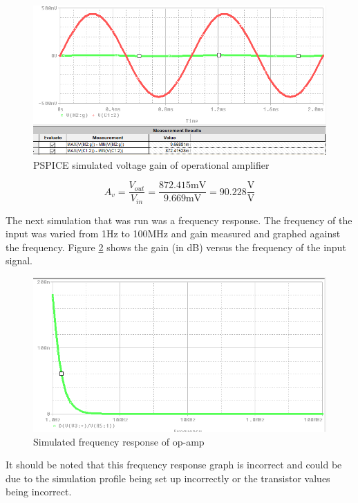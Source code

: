 \documentclass[11pt]{article}
\begin{document}
	\begin{figure}[H]
		\includegraphics[width=\textwidth]{voltage_gain.png}
		\caption{PSPICE simulated voltage gain of operational amplifier}
		\label{fig:pspice_gain}
	\end{figure}

	\begin{equation}
		A_v = \frac{V_{out}}{V_{in}} = \frac{872.415\si{\milli\volt}}{9.669\si{\milli\volt}} = 90.228 \frac{\si\volt}{\si\volt}
	\end{equation}

	The next simulation that was run was a frequency response. The frequency of the input was varied
	from 1$\si\hertz$ to 100$\si{\mega\hertz}$ and gain measured and graphed against the frequency. 
	Figure \ref{fig:freq_response} shows the gain (in dB) versus the frequency of the input signal.

	\begin{figure}[H]
		\includegraphics[width=\textwidth]{frequency_response.png}
		\caption{Simulated frequency response of op-amp}
		\label{fig:freq_response}
	\end{figure}
	
	It should be noted that this frequency response graph is incorrect and could 
	be due to the simulation profile being set up incorrectly or the transistor values
	being incorrect. 
\end{document}

